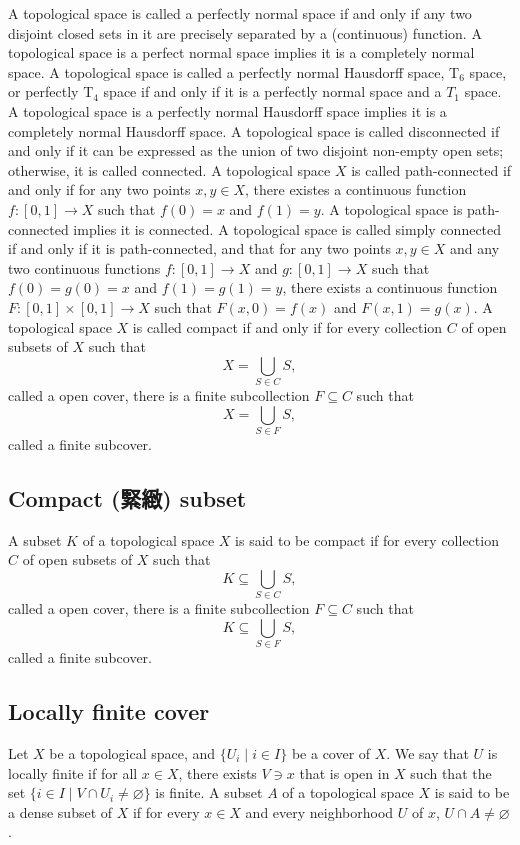 \documentclass[a4paper,12pt]{article}
\begin{document}
A topological space is called a perfectly normal space if and only if any two disjoint closed sets in it are precisely separated by a (continuous) function. A topological space is a perfect normal space implies it is a completely normal space.
A topological space is called a perfectly normal Hausdorff space, T$_6$ space, or perfectly T$_4$ space if and only if it is a perfectly normal space and a $T_1$ space. A topological space is a perfectly normal Hausdorff space implies it is a completely normal Hausdorff space.
A topological space is called disconnected if and only if it can be expressed as the union of two disjoint non-empty open sets; otherwise, it is called connected.
A topological space $X$ is called path-connected if and only if for any two points $x,y\in X$, there existes a continuous function $f\colon[0,1]\to X$ such that $f(0)=x$ and $f(1)=y$. A topological space is path-connected implies it is connected.
A topological space is called simply connected if and only if it is path-connected, and that for any two points $x,y\in X$ and any two continuous functions $f\colon[0,1]\to X$ and $g\colon[0,1]\to X$ such that $f(0)=g(0)=x$ and $f(1)=g(1)=y$, there exists a continuous function $F\colon[0,1]\times[0,1]\to X$ such that $F(x,0)=f(x)$ and $F(x,1)=g(x)$.
A topological space $X$ is called compact if and only if for every collection $C$ of open subsets of $X$ such that
\[X=\bigcup_{S\in C}S,\]
called a open cover, there is a finite subcollection $F\subseteq C$ such that
\[X=\bigcup _{S\in F}S,\]
called a finite subcover.
\subsection{Compact (緊緻) subset}
A subset $K$ of a topological space $X$ is said to be compact if for every collection $C$ of open subsets of $X$ such that
\[K\subseteq\bigcup_{S\in C}S,\]
called a open cover, there is a finite subcollection $F\subseteq C$ such that
\[K\subseteq\bigcup _{S\in F}S,\]
called a finite subcover.
\subsection{Locally finite cover}
Let $X$ be a topological space, and $\{U_i\mid i\in I\}$ be a cover of $X$. We say that $U$ is locally finite if for all $x\in X$, there exists $V\ni x$ that is open in $X$ such that the set $\{i\in I\mid V\cap U_i\neq\varnothing\}$ is finite.
A subset $A$ of a topological space $X$ is said to be a dense subset of $X$ if for every $x\in X$ and every neighborhood $U$ of $x$, $U\cap A\neq\varnothing$.
\end{document}
